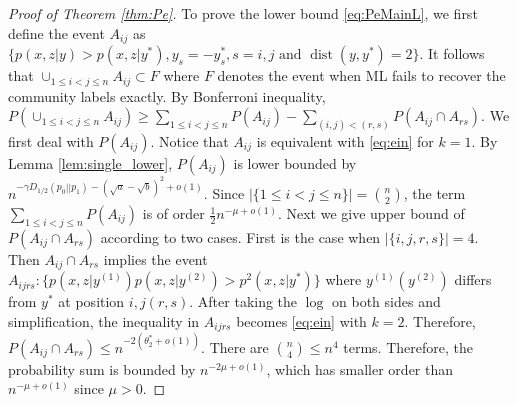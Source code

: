 \documentclass[conference]{IEEEtran}
\DeclareMathOperator{\dist}{dist}
\begin{document}
\begin{proof}[Proof of Theorem \ref{thm:Pe}]
To prove the lower bound \eqref{eq:PeMainL}, we first
define the event $A_{ij}$ as $\{p(x,z|y) > p(x,z|y^*),y_s=-y^*_s, s=i,j \textrm{ and } \dist(y,y^*)=2  \}$.
It follows that $\cup_{1\leq i < j\leq n} A_{ij} \subset F$ where $F$ denotes the event when ML fails to recover the community labels exactly.
By Bonferroni inequality,
$P(\cup_{1\leq i < j\leq n} A_{ij}) \geq \sum_{1\leq i < j\leq n} P(A_{ij}) - \sum_{(i,j) < (r,s) } P(A_{ij} \cap A_{rs})$.
We first deal with $P(A_{ij})$. Notice that $A_{ij}$ is equivalent with \eqref{eq:ein} for $k=1$. By Lemma \ref{lem:single_lower}, $P(A_{ij})$ is lower bounded by $n^{-\gamma D_{1/2}(p_0 || p_1)-(\sqrt{a} - \sqrt{b})^2 +o(1)}$. Since $|\{1\leq i < j\leq n\}|=\binom{n}{2}$, the term $\sum_{1\leq i < j\leq n} P(A_{ij})$ is of order $\frac{1}{2}n^{-\mu+o(1)}$.
Next we give upper bound of $P(A_{ij} \cap A_{rs})$ according to two cases.
First is the case when $|\{i,j,r,s\}|=4$. Then $A_{ij} \cap A_{rs}$ implies the event
$A_{ijrs}: \{p(x,z|y^{(1)})p(x,z|y^{(2)}) > p^2(x,z|y^*)\}$ where $y^{(1)}(y^{(2)})$ differs from $y^*$ at position $i,j(r,s)$.
After taking the $\log$ on both sides and simplification, the inequality in $A_{ijrs}$ becomes \eqref{eq:ein}  with $k=2$.
Therefore, $P(A_{ij} \cap A_{rs}) \leq n^{-2(\theta^*_2 + o(1))} $. There are
$\binom{n}{4} \leq n^4$ terms. Therefore, the probability sum
is bounded by $n^{-2\mu +o(1)}$, which has smaller order than $n^{-\mu+o(1)}$ since $\mu > 0$.


\end{proof}
\end{document}
